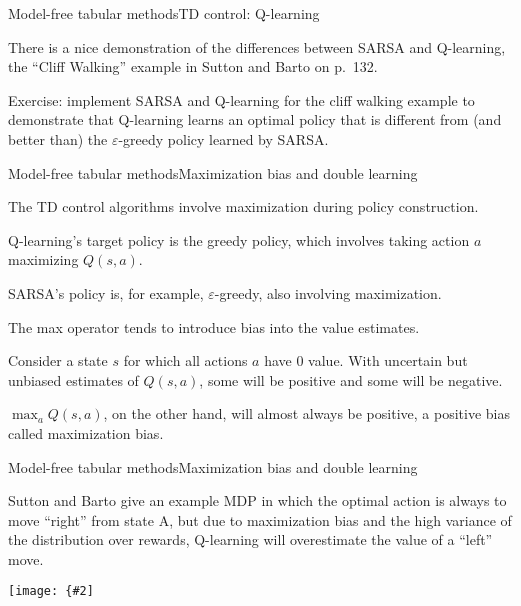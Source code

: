 \documentclass{beamer}
\newcommand{\myfig}[3]{\centerline{\texttt{[image: \{\#2]}}}
    \centerline{\scriptsize #3}}
\begin{document}
\begin{frame}{Model-free tabular methods}{TD control: Q-learning}

  There is a nice demonstration of the differences between SARSA and
  Q-learning, the ``Cliff Walking'' example in Sutton and Barto on
  p.\ 132.

  \medskip

  \alert{Exercise}: implement SARSA and Q-learning for the cliff walking
  example to demonstrate that Q-learning learns an optimal policy that is
  different from (and better than) the $\varepsilon$-greedy policy learned
  by SARSA.
  
\end{frame}


\begin{frame}{Model-free tabular methods}{Maximization bias and double learning}

  The TD control algorithms involve \alert{maximization} during policy
  construction.

  \medskip

  Q-learning's target policy is the greedy policy, which involves
  taking action $a$ maximizing $Q(s,a)$.

  \medskip

  SARSA's policy is, for example, $\varepsilon$-greedy, also involving
  maximization.

  \medskip

  The max operator tends to introduce \alert{bias} into the value estimates.

  \medskip

  Consider a state $s$ for which all actions $a$ have 0 value. With
  uncertain but unbiased estimates of $Q(s,a)$, some will be positive
  and some will be negative.

  \medskip

  $\max_a Q(s,a)$, on the other hand, will almost always be positive,
  a positive bias called \alert{maximization bias}.

\end{frame}


\begin{frame}{Model-free tabular methods}{Maximization bias and double learning}

  Sutton and Barto give an example MDP in which the optimal
  action is always to move ``right'' from state A, but due to maximization
  bias and the high variance of the distribution over rewards,
  Q-learning will overestimate the value of a ``left'' move.

  \bigskip
  
  \myfig{3in}{sutton-fig6-5}{Sutton and Barto (2018), Fig.\ 6.5}
  
\end{frame}
\end{document}
